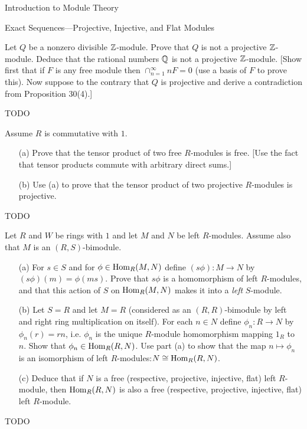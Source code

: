 \begin{chapter}{Introduction to Module Theory}
\begin{section}{Exact Sequences---Projective, Injective, and Flat Modules}
\begin{solution}
\end{solution}\oneperpage



\begin{problem}\label{ex:10.5.8}
Let $Q$ be a nonzero divisible $\mathbb{Z}$-module. Prove that $Q$ is not a projective $\mathbb{Z}$-module. Deduce that the rational numbers $\mathbb{Q}$ is not a projective $\mathbb{Z}$-module. [Show first that if $F$ is any free module then $\cap_{n=1}^\infty nF = 0$ (use a basis of $F$ to prove this). Now suppose to the contrary that $Q$ is projective and derive a contradiction from Proposition 30(4).]
\end{problem}
\begin{solution}TODO

\end{solution}\oneperpage



\begin{problem}\label{ex:10.5.9}
Assume $R$ is commutative with $1$. \begin{enumerate}
\item[(a)] Prove that the tensor product of two free $R$-modules is free. [Use the fact that tensor products commute with arbitrary direct sums.]
\item[(b)] Use (a) to prove that the tensor product of two projective $R$-modules is projective.
\end{enumerate}
\end{problem}
\begin{solution}TODO

\end{solution}\oneperpage



\begin{problem}\label{ex:10.5.10}
Let $R$ and $W$ be rings with $1$ and let $M$ and $N$ be left $R$-modules. Assume also that $M$ is an $(R,S)$-bimodule.
\begin{enumerate}
\item[(a)] For $s\in S$ and for $\phi\in\operatorname{Hom}_R(M,N)$ define $(s\phi):M\to N$ by $(s\phi)(m) = \phi(ms)$. Prove that $s\phi$ is a homomorphism of left $R$-modules, and that this action of $S$ on $\operatorname{Hom}_R(M,N)$ makes it into a \emph{left} $S$-module.
\item[(b)] Let $S=R$ and let $M=R$ (considered as an $(R,R)$-bimodule by left and right ring multiplication on itself). For each $n\in N$ define $\phi_n:R\to N$ by $\phi_n(r) = rn$, i.e. $\phi_n$ is the unique $R$-module homomorphism mapping $1_R$ to $n$. Show that $\phi_n\in \operatorname{Hom}_R(R,N)$. Use part (a) to show that the map $n\mapsto \phi_n$ is an isomorphism of left $R$-modules:$N\cong\operatorname{Hom}_R(R,N)$. 
\item[(c)] Deduce that if $N$ is a free (respective, projective, injective, flat) left $R$-module, then $\operatorname{Hom}_R(R,N)$ is also a free (respective, projective, injective, flat) left $R$-module.
\end{enumerate}
\end{problem}
\begin{solution}TODO


\end{solution}
\end{section}
\end{chapter}
